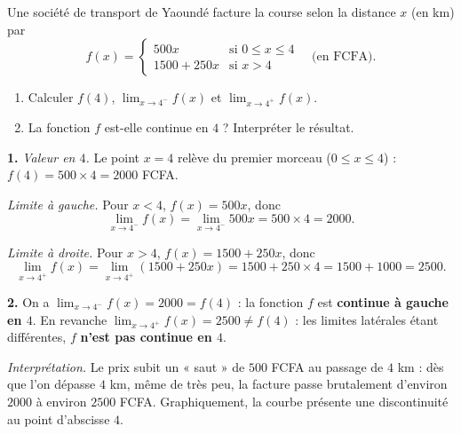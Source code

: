 \documentclass[11pt]{article}
\begin{document}
\begin{exoresolu}
Une société de transport de Yaoundé facture la course selon la distance $x$ (en km) par
\[ f(x)=\begin{cases} 500x & \text{si } 0\leq x\leq 4 \\ 1500+250x & \text{si } x>4 \end{cases} \quad \text{(en FCFA).} \]
\begin{enumerate}
\item Calculer $f(4)$, $\lim_{x\to 4^-}f(x)$ et $\lim_{x\to 4^+}f(x)$.
\item La fonction $f$ est-elle continue en $4$ ? Interpréter le résultat.
\end{enumerate}
\tcblower
\textbf{1.} \emph{Valeur en $4$.} Le point $x=4$ relève du premier morceau ($0\leq x\leq 4$) : $f(4)=500\times 4=2000$ FCFA.

\emph{Limite à gauche.} Pour $x<4$, $f(x)=500x$, donc
\[ \lim_{x\to 4^-}f(x)=\lim_{x\to 4^-}500x=500\times 4=2000. \]

\emph{Limite à droite.} Pour $x>4$, $f(x)=1500+250x$, donc
\[ \lim_{x\to 4^+}f(x)=\lim_{x\to 4^+}(1500+250x)=1500+250\times 4=1500+1000=2500. \]

\textbf{2.} On a $\lim_{x\to 4^-}f(x)=2000=f(4)$ : la fonction $f$ est \textbf{continue à gauche en $4$}. En revanche $\lim_{x\to 4^+}f(x)=2500\neq f(4)$ : les limites latérales étant différentes, $f$ \textbf{n'est pas continue en $4$}.

\emph{Interprétation.} Le prix subit un « saut » de $500$ FCFA au passage de $4$ km : dès que l'on dépasse $4$ km, même de très peu, la facture passe brutalement d'environ $2000$ à environ $2500$ FCFA. Graphiquement, la courbe présente une discontinuité au point d'abscisse $4$.
\end{exoresolu}
\end{document}

